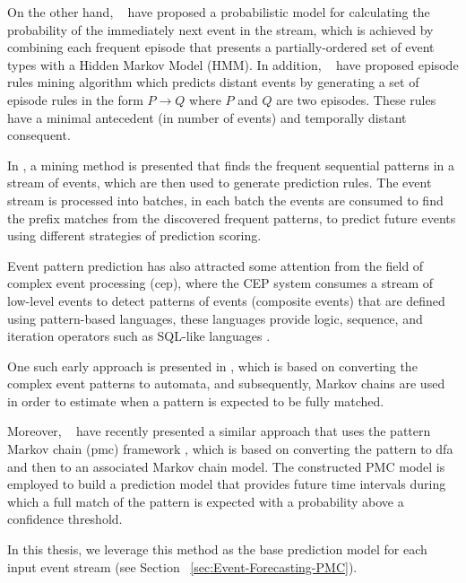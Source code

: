 \par On the other hand, ~\citet{laxman_stream_2008} have proposed a probabilistic model for calculating the probability of the immediately next event in the stream, which is achieved by combining each frequent episode \cite{mannila1997discovery} that presents a partially-ordered set of event types with a Hidden Markov Model (HMM). In addition, ~\citet{fahed_efficient_2014} have proposed episode rules mining algorithm which predicts distant events by generating a set of episode rules in the form \(P \rightarrow Q \) where $P$ and $Q$ are two episodes. These rules have a minimal antecedent (in number of events) and temporally distant consequent.

\par In \cite{zhou_pattern_2015}, a mining method is presented that finds the frequent sequential patterns in a stream of events, which are then used to generate prediction rules. The event stream is processed into batches, in each batch the events are consumed to find the prefix matches from the discovered frequent patterns, to predict future events using different strategies of prediction scoring.

\par Event pattern prediction has also attracted some attention from the field of complex event processing (\ac{cep}), where the CEP system consumes a stream of low-level events to detect patterns of events (composite events) that are defined using pattern-based languages, these languages provide logic, sequence, and iteration operators such as SQL-like languages \cite{Cugola:2012:PFI:2187671.2187677}. 

\par One such early approach is presented in \cite{muthusamy_predictive_2010}, which is based on converting the complex event patterns to automata, and subsequently, Markov chains are used in order to estimate when a pattern is expected to be fully matched. 
\par Moreover, ~\citet{alevizos2017event} have recently presented a similar approach that uses the pattern Markov chain (\ac{pmc}) framework \cite{nuel_pattern_2008}, which is based on converting the pattern to \ac{dfa} and then to an associated Markov chain model. The constructed PMC model is employed to build a prediction model that provides future time intervals during which a full match of the pattern is expected with a probability above a confidence threshold.
\par  In this thesis, we leverage this method as the base prediction model for each input event stream (see Section ~\ref{sec:Event-Forecasting-PMC}). 
